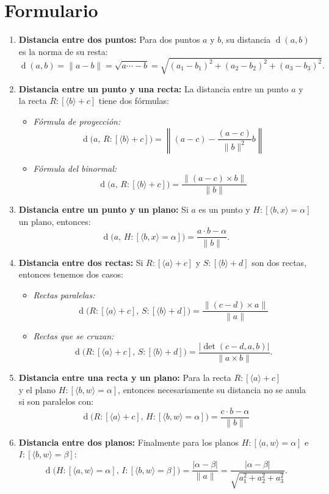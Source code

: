 \documentclass[11pt, a4paper]{article}
\DeclareMathOperator{\dd}{d}
\begin{document}
\section{Formulario}
\begin{enumerate}[label = \textbf{\arabic*.}]
\item\textbf{Distancia entre dos puntos:}  Para dos puntos \(a\) y \(b\), su distancia \( \dd(a,b)\) es la norma de su resta:\[\dd(a,b)=\|a-b\|=\sqrt{a\cdots -b}=\sqrt{(a_1-b_1)^2+(a_2-b_2)^2+(a_3-b_3)^2}.\]
\item\textbf{Distancia entre un punto y una recta:} La distancia entre un punto \(a\) y la recta \( R: [\langle b\rangle +c] \) tiene dos fórmulas:\begin{itemize}
\item\emph{Fórmula de proyección:}\[\dd\big(a,\,R:[\langle b\rangle+c]\big)=\left\|(a-c)-\dfrac{(a-c)}{\|b\|^2}b \right\|\]
\item\emph{Fórmula del binormal:}\[\dd \big( a, \, R:[\langle b \rangle + c] \big) = \dfrac{ \big\|(a-c) \times b \big\|}{\| b \|} \]
\end{itemize}
\item	\textbf{Distancia entre un punto y un plano:} Si \(a\) es un punto y \(H:[\langle b,x\rangle = \alpha]\) un plano, entonces:\[\dd \big( a, \, H:[ \langle b,x \rangle = \alpha] \big) =\dfrac{ a \cdot b - \alpha }{ \|b\| }.\]
\item \textbf{Distancia entre dos rectas:} Si  \( R:[\langle a \rangle + c] \) y  \( S: [\langle b \rangle + d]\) son dos rectas, entonces tenemos dos casos:\begin{itemize}
\item\emph{Rectas paralelas:}\[ \dd \big(  R: [ \langle a \rangle + c ], \, S : [ \langle b \rangle + d ] \big) =\dfrac{ \big\| (c-d)  \times a \big\| }{ \| a  \| }\]\item\emph{Rectas que se cruzan:}\[\dd \big(  R: [ \langle a \rangle + c ], \, S : [ \langle b \rangle + d ] \big) 
	=\dfrac{ \big| \det( c-d, a, b ) \big| }{ \| a\times b\| }.\]
		\end{itemize}
			
\item 
\textbf{Distancia
 entre una recta y un
  plano:} Para la recta \( R:[\langle a \rangle + c] \) \(\text{y el plano}\) \( H: [\langle b,w\rangle=\alpha]\), entonces necesariamente su distancia no se anula si son paralelos con:
\[\dd \big(  R: [ \langle a \rangle + c ], \, H : [ \langle b, w \rangle = \alpha ] \big) 
=
			\dfrac{c \cdot b - \alpha}{\|b\|} 		\]
\item \textbf{Distancia entre dos planos:} Finalmente para los planos  \( H:[\langle a,w \rangle = \alpha] \) e  \( I: [\langle b,w\rangle=\beta]\):
\[
			\dd \big(  H: [ \langle a,w \rangle = \alpha ], \, I : [\langle b,w \rangle = \beta] \big) =\dfrac{ | \alpha - \beta | }{\|a\|}=\dfrac{|\alpha-\beta|}{ \sqrt{a_1^2 + a_2^2 + a_3^2} }.	\]
\end{enumerate}
\end{document}
